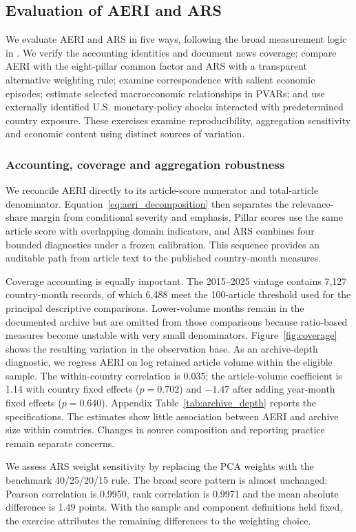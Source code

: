 \documentclass[12pt]{article}
\begin{document}
\subsection{Evaluation of AERI and ARS}\label{sec:validation}
We evaluate AERI and ARS in five ways, following the broad measurement logic in \citet{baker2016}. We verify the accounting identities and document news coverage; compare AERI with the eight-pillar common factor and ARS with a transparent alternative weighting rule; examine correspondence with salient economic episodes; estimate selected macroeconomic relationships in PVARs; and use externally identified U.S. monetary-policy shocks interacted with predetermined country exposure. These exercises examine reproducibility, aggregation sensitivity and economic content using distinct sources of variation.

\subsubsection{Accounting, coverage and aggregation robustness}
We reconcile AERI directly to its article-score numerator and total-article denominator. Equation~\eqref{eq:aeri_decomposition} then separates the relevance-share margin from conditional severity and emphasis. Pillar scores use the same article score with overlapping domain indicators, and ARS combines four bounded diagnostics under a frozen calibration. This sequence provides an auditable path from article text to the published country-month measures.

Coverage accounting is equally important. The 2015--2025 vintage contains 7,127 country-month records, of which 6,488 meet the 100-article threshold used for the principal descriptive comparisons. Lower-volume months remain in the documented archive but are omitted from those comparisons because ratio-based measures become unstable with very small denominators. Figure~\ref{fig:coverage} shows the resulting variation in the observation base. As an archive-depth diagnostic, we regress AERI on log retained article volume within the eligible sample. The within-country correlation is 0.035; the article-volume coefficient is 1.14 with country fixed effects ($p=0.702$) and $-1.47$ after adding year-month fixed effects ($p=0.640$). Appendix Table~\ref{tab:archive_depth} reports the specifications. The estimates show little association between AERI and archive size within countries. Changes in source composition and reporting practice remain separate concerns.

We assess ARS weight sensitivity by replacing the PCA weights with the benchmark 40/25/20/15 rule. The broad score pattern is almost unchanged: Pearson correlation is 0.9950, rank correlation is 0.9971 and the mean absolute difference is 1.49 points. With the sample and component definitions held fixed, the exercise attributes the remaining differences to the weighting choice.
\end{document}
